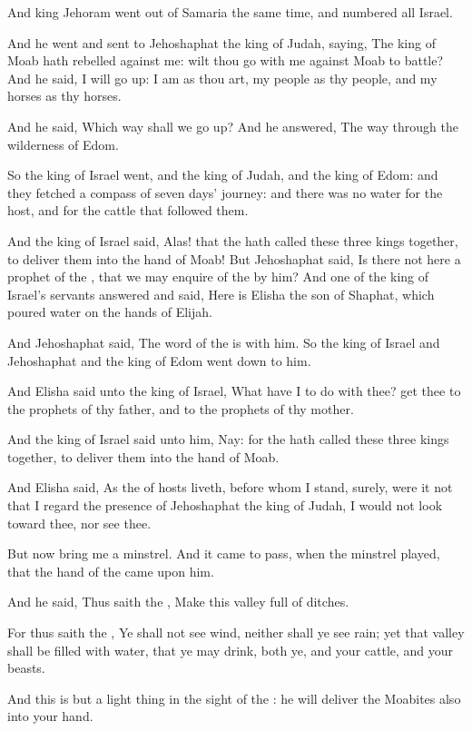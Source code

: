 \verse And king Jehoram went out of Samaria the same time, and numbered all Israel.

\verse And he went and sent to Jehoshaphat the king of Judah, saying, The king of Moab hath rebelled against me: wilt thou go with me against Moab to battle? And he said, I will go up: I am as thou art, my people as thy people, and my horses as thy horses.

\verse And he said, Which way shall we go up? And he answered, The way through the wilderness of Edom.

\verse So the king of Israel went, and the king of Judah, and the king of Edom: and they fetched a compass of seven days' journey: and there was no water for the host, and for the cattle that followed them.

\verse And the king of Israel said, Alas! that the \LORD hath called these three kings together, to deliver them into the hand of Moab!  \verse But Jehoshaphat said, Is there not here a prophet of the \LORD, that we may enquire of the \LORD by him? And one of the king of Israel's servants answered and said, Here is Elisha the son of Shaphat, which poured water on the hands of Elijah.

\verse And Jehoshaphat said, The word of the \LORD is with him. So the king of Israel and Jehoshaphat and the king of Edom went down to him.

\verse And Elisha said unto the king of Israel, What have I to do with thee?  get thee to the prophets of thy father, and to the prophets of thy mother.

And the king of Israel said unto him, Nay: for the \LORD hath called these three kings together, to deliver them into the hand of Moab.

\verse And Elisha said, As the \LORD of hosts liveth, before whom I stand, surely, were it not that I regard the presence of Jehoshaphat the king of Judah, I would not look toward thee, nor see thee.

\verse But now bring me a minstrel. And it came to pass, when the minstrel played, that the hand of the \LORD came upon him.

\verse And he said, Thus saith the \LORD, Make this valley full of ditches.

\verse For thus saith the \LORD, Ye shall not see wind, neither shall ye see rain; yet that valley shall be filled with water, that ye may drink, both ye, and your cattle, and your beasts.

\verse And this is but a light thing in the sight of the \LORD: he will deliver the Moabites also into your hand.

